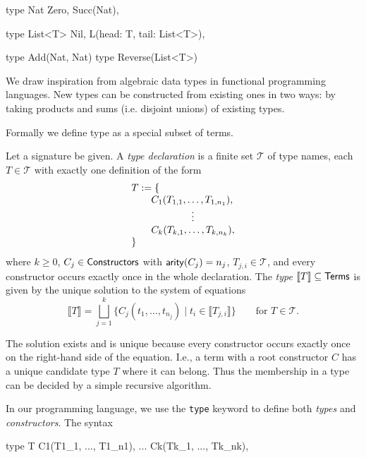 \documentclass[11pt]{article}
\begin{document}
\begin{rrscode}
type Nat {
  Zero,
  Succ(Nat),
}

type List<T> {
  Nil,
  L(head: T, tail: List<T>),
}

type Add(Nat, Nat)
type Reverse(List<T>)
\end{rrscode}

We draw inspiration from algebraic data types in functional programming languages.
New types can be constructed from existing ones in two ways: by taking products
and sums (i.e. disjoint unions) of existing types.

Formally we define type as a special subset of terms.

\begin{definition}
Let a signature be given. A \emph{type declaration} is a finite set $\mathcal{T}$ of type names,
each $T \in \mathcal{T}$ with exactly one definition of the form
\[
  \begin{array}{@{\qquad}l@{}}
    \multicolumn{1}{@{}l@{}}{T := \{} \\
    C_1(T_{1,1}, \dots, T_{1,n_1}), \\
    \multicolumn{1}{@{\qquad}c@{}}{\vdots} \\
    C_k(T_{k,1}, \dots, T_{k,n_k}), \\
    \multicolumn{1}{@{}l@{}}{\}}
  \end{array}
\]
where $k \ge 0$, $C_j \in \mathsf{Constructors}$ with $\mathsf{arity}(C_j) = n_j$, $T_{j,i} \in \mathcal{T}$,
and every constructor occurs exactly once in the whole declaration.
The \emph{type} $\llbracket T\rrbracket \subseteq \mathsf{Terms}$ is given by the unique
solution to the system of equations
\[
  \llbracket T\rrbracket = \bigsqcup_{j=1}^{k}
    \{C_j(t_1, \dots, t_{n_j}) \mid t_i \in \llbracket T_{j,i}\rrbracket\}
    \qquad \text{for } T \in \mathcal{T}.
\]
\end{definition}

\begin{note}
The solution exists and is unique because every constructor occurs exactly once on the
right-hand side of the equation. I.e., a term with a root constructor $C$ has a unique
candidate type $T$ where it can belong. Thus the membership in a type can be
decided by a simple recursive algorithm.
\end{note}

In our programming language, we use the \lstinline|type| keyword to define both
\emph{types} and \emph{constructors}. The syntax

\begin{rrscode}
type T {
  C1(T1_1, ..., T1_n1),
  ...
  Ck(Tk_1, ..., Tk_nk),
}
\end{rrscode}
\end{document}
